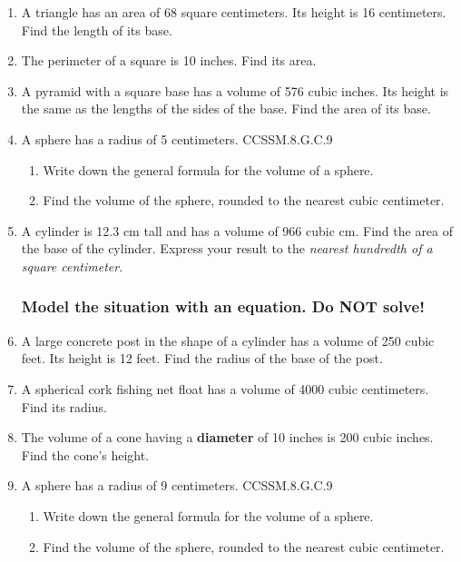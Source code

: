 \begin{enumerate}
\item A triangle has an area of 68 square centimeters. Its height is 16 centimeters. Find the length of its base. \vspace{3cm}

\item The perimeter of a square is 10 inches. Find its area. \vspace{4cm}

\item A pyramid with a square base has a volume of 576 cubic inches. Its height is the same as the lengths of the sides of the base. Find the area of its base.

\item A sphere has a radius of 5 centimeters. \hfill CCSSM.8.G.C.9
\begin{enumerate}
  \item Write down the general formula for the volume of a sphere. \vspace{1cm}
  \item Find the volume of the sphere, rounded to the nearest cubic centimeter.
\end{enumerate}  \vspace{3cm}

\item A cylinder is 12.3 cm tall and has a volume of 966 cubic cm. Find the area of the base of the cylinder. Express your result to the \emph{nearest hundredth of a square centimeter}. \vspace{3cm}

\subsubsection*{Model the situation with an equation. \hfill Do NOT solve!}
\item A large concrete post in the shape of a cylinder has a volume of 250 cubic feet. Its height is 12 feet. Find the radius of the base of the post. \vspace{2cm}

\item A spherical cork fishing net float has a volume of 4000 cubic centimeters. Find its radius. \vspace{2cm}

\item The volume of a cone having a \textbf{diameter} of 10 inches is 200 cubic inches. Find the cone's height.
  

\item A sphere has a radius of 9 centimeters. \hfill CCSSM.8.G.C.9
\begin{enumerate}
  \item Write down the general formula for the volume of a sphere. \vspace{1cm}
  \item Find the volume of the sphere, rounded to the nearest cubic centimeter.
\end{enumerate}  \vspace{3cm}


\end{enumerate}
